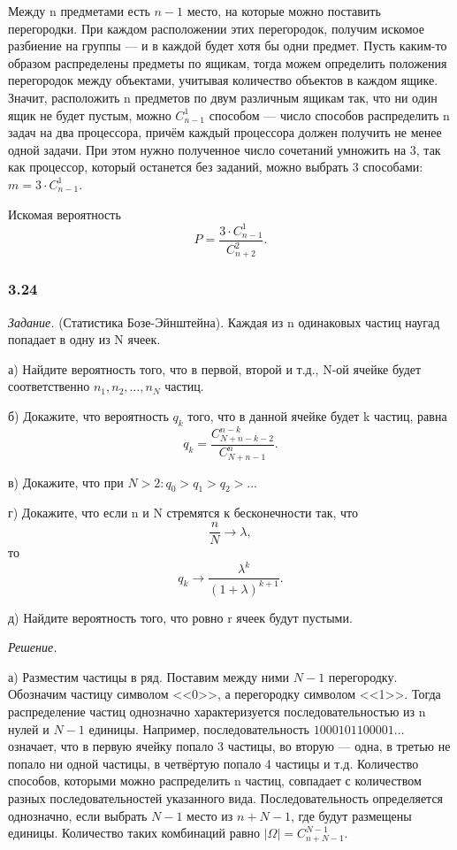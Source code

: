 \documentclass{book}
\begin{document}
Между n предметами есть $n-1$ место, на которые можно поставить перегородки.
При каждом расположении этих перегородок, получим искомое разбиение на группы --- и в каждой будет хотя бы одни предмет.
Пусть каким-то образом распределены предметы по ящикам, тогда можем определить положения перегородок между объектами,
учитывая количество объектов в каждом ящике.
Значит,
расположить n предметов по двум различным ящикам так,
что ни один ящик не будет пустым,
можно $ C_{n-1}^1 $ способом ---
число способов распределить n задач на два процессора,
причём каждый процессора должен получить не менее одной задачи.
При этом нужно полученное число сочетаний умножить на 3,
так как процессор, который останется без заданий, можно выбрать 3 способами: $ m = 3 \cdot C_{n-1}^1 $.

Искомая вероятность
$$ P =
\frac{ 3 \cdot C_{n-1}^1 }{ C_{n+2}^{2} }.$$

\subsubsection*{3.24}

\textit{Задание.} (Статистика Бозе-Эйнштейна).
Каждая из n одинаковых частиц наугад попадает в одну из N ячеек.

а) Найдите вероятность того, что в первой, второй и т.д., N-ой ячейке будет соответственно $ n_1, n_2, \dotsc , n_N $ частиц.

б) Докажите, что вероятность $ q_k $ того, что в данной ячейке будет k частиц, равна
$$ q_k =
\frac{ C_{ N+n-k-2 }^{ n-k } }{ C_{ N+n-1 }^n }.$$

в) Докажите, что при $ N > 2 : q_0 > q_1 > q_2 > \dotsc $

г) Докажите, что если n и N стремятся к бесконечности так, что
$$ \frac{ n }{ N } \rightarrow \lambda,$$
то
$$ q_k \rightarrow \frac{ \lambda^k }{ \left( 1 + \lambda \right)^{ k+1 } }.$$

д) Найдите вероятность того, что ровно r ячеек будут пустыми.

\textit{Решение.}

а) Разместим частицы в ряд.
Поставим между ними $ N - 1 $ перегородку.
Обозначим частицу символом <<0>>, а перегородку символом <<1>>.
Тогда распределение частиц однозначно характеризуется последовательностью из n нулей и $ N - 1 $ единицы.
Например, последовательность
$ 1000101100001 \dotsc $
означает, что в первую ячейку попало 3 частицы, во вторую --- одна, в третью не попало ни одной частицы, в четвёртую попало 4 частицы и т.д.
Количество способов, которыми можно распределить n частиц, совпадает с количеством разных последовательностей указанного вида.
Последовательность определяется однозначно, если выбрать $ N - 1 $ место из $ n + N - 1$, где будут размещены единицы.
Количество таких комбинаций равно $ | \Omega | = C_{n+N-1}^{N-1} $.
\end{document}
